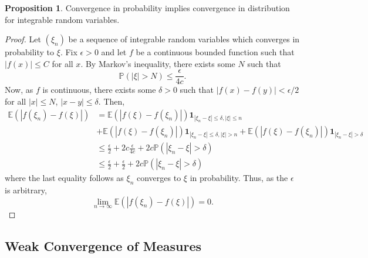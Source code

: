 \documentclass[]{article}
\theoremstyle{definition}
\theoremstyle{definition}
\newtheorem{proposition}{Proposition}[section]
\begin{document}
\begin{proposition}
  Convergence in probability implies convergence in distribution for integrable 
  random variables.
\end{proposition}
\begin{proof}
  Let \((\xi_n)\) be a sequence of integrable random variables which converges 
  in probability to \(\xi\). Fix \(\epsilon > 0\) and let \(f\) be a continuous 
  bounded function such that \(|f(x)| \le C\) for all \(x\). By Markov's 
  inequality, there exists some \(N\) such that 
  \[\mathbb{P}(|\xi| > N) \le \frac{\epsilon}{4c}.\]
  Now, as \(f\) is continuous, there exists some \(\delta > 0\) such that 
  \(|f(x) - f(y)| < \epsilon / 2\) for all \(|x|\le N\), \(|x - y| \le \delta\).
  Then, 
  \[\begin{split}
    \mathbb{E}(|f(\xi_n) - f(\xi)|) & = 
    \mathbb{E}(|f(\xi) - f(\xi_n)|)\mathbf{1}_{|\xi_n - \xi| \le \delta, |\xi| \le n}\\
    & + \mathbb{E}(|f(\xi) - f(\xi_n)|)\mathbf{1}_{|\xi_n - \xi| \le \delta, |\xi| > n}
    + \mathbb{E}(|f(\xi) - f(\xi_n)|)\mathbf{1}_{|\xi_n - \xi| > \delta}\\
    & \le \frac{\epsilon}{2} + 2c \frac{\epsilon}{4c} + 2c \mathbb{P}(|\xi_n - \xi| > \delta)\\
    & \le \frac{\epsilon}{2} + \frac{\epsilon}{2} + 2c \mathbb{P}(|\xi_n - \xi| > \delta)
  \end{split}\]
  where the last equality follows as \(\xi_n\) converges to \(\xi\) in probability.
  Thus, as the \(\epsilon\) is arbitrary, 
  \[\lim_{n \to \infty} \mathbb{E}(|f(\xi_n) - f(\xi)|) = 0.\]
\end{proof}

\subsection{Weak Convergence of Measures}
\end{document}
